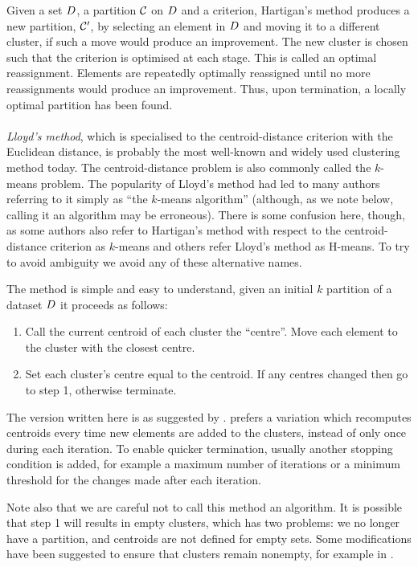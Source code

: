 Given a set $D$, a partition $\mathcal{C}$ on $D$ and a criterion,
Hartigan's method produces a new partition, $\mathcal{C}'$, by selecting an element
in $D$ and moving it to a different cluster, if such a move would produce
an improvement.  The new cluster is chosen such that the criterion is
optimised at each stage.  This is called an optimal reassignment.  Elements
are repeatedly optimally reassigned until no more reassignments would produce
an improvement.  Thus, upon termination, a locally optimal partition has been
found.
\\\\
\noindent \textit{Lloyd's method}, which is specialised to the
centroid-distance criterion with the Euclidean distance, is probably the most
well-known and widely used clustering method today.  The centroid-distance
problem is also commonly called the $k$-means problem.  The popularity of
Lloyd's method had led to many authors referring to it simply as ``the
$k$-means algorithm'' (although, as we note below, calling it an algorithm may
be erroneous).  There is some confusion here, though, as some authors also
refer to Hartigan's method with respect to the centroid-distance criterion as
$k$-means and others refer Lloyd's method as H-means.  To try to avoid
ambiguity we avoid any of these alternative names.

The method is simple and easy to understand, given an initial $k$ partition of
a dataset $D$ it proceeds as follows:
\begin{enumerate}
\item Call the current centroid of each cluster the ``centre''.  Move each
  element to the cluster with the closest centre.
\item Set each cluster's centre equal to the centroid.  If any centres changed
  then go to step 1, otherwise terminate.
\end{enumerate}

The version written here is as suggested by \citet{ballhall67clustering}.
\citet{macqueen1967some} prefers a variation which recomputes centroids every
time new elements are added to the clusters, instead of only once during each
iteration.  To enable quicker termination, usually another stopping condition
is added, for example a maximum number of iterations or a minimum threshold
for the changes made after each iteration.

Note also that we are careful not to call this method an algorithm.  It is
possible that step 1 will results in empty clusters, which has two problems:
we no longer have a partition, and centroids are not defined for empty sets.
Some modifications have been suggested to ensure that clusters remain
nonempty, for example in \citep{pakhira2009modified}.

